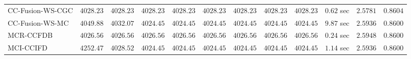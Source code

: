 \begin{table}[H]
\begin{tabular}{lrrrrrrrrrrr}
    CC-Fusion-WS-CGC & $      4028.23$ & $      4028.23$ & $      4028.23$ & $      4028.23$ & $      4028.23$ & $      4028.23$ & $      4028.23$ & $      4028.23$ & $         0.62$ sec    & $       2.5781$  & $       0.8604$ \\ 
     CC-Fusion-WS-MC & $      4049.88$ & $      4032.07$ & $      4024.45$ & $      4024.45$ & $      4024.45$ & $      4024.45$ & $      4024.45$ & $      4024.45$ & $         9.87$ sec    & $       2.5936$  & $       0.8600$ \\ 
\cmidrule{1-1} 
           MCR-CCFDB & $      4026.56$ & $      4026.56$ & $      4026.56$ & $      4026.56$ & $      4026.56$ & $      4026.56$ & $      4026.56$ & $      4026.56$ & $         0.24$ sec    & $       2.5948$  & $       0.8600$ \\ 
\cmidrule{1-1} 
           MCI-CCIFD & $      4252.47$ & $      4028.52$ & $      4024.45$ & $      4024.45$ & $      4024.45$ & $      4024.45$ & $      4024.45$ & $      4024.45$ & $         1.14$ sec    & $       2.5936$  & $       0.8600$ \\ 
\bottomrule
\end{tabular}
\end{table}


